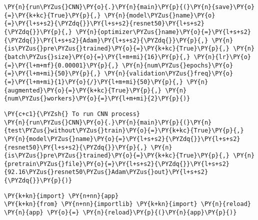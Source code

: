     \begin{tcolorbox}[breakable, size=fbox, boxrule=1pt, pad at break*=1mm,colback=cellbackground, colframe=cellborder]
\begin{Verbatim}[commandchars=\\\{\}]
\PY{n}{run\PYZus{}CNN}\PY{o}{.}\PY{n}{main}\PY{p}{(}\PY{n}{save}\PY{o}{=}\PY{k+kc}{True}\PY{p}{,} \PY{n}{model\PYZus{}name}\PY{o}{=}\PY{l+s+s2}{\PYZdq{}}\PY{l+s+s2}{resnet50}\PY{l+s+s2}{\PYZdq{}}\PY{p}{,} \PY{n}{optimizer\PYZus{}name}\PY{o}{=}\PY{l+s+s2}{\PYZdq{}}\PY{l+s+s2}{Adam}\PY{l+s+s2}{\PYZdq{}}\PY{p}{,} \PY{n}{is\PYZus{}pre\PYZus{}trained}\PY{o}{=}\PY{k+kc}{True}\PY{p}{,} \PY{n}{batch\PYZus{}size}\PY{o}{=}\PY{l+m+mi}{16}\PY{p}{,} \PY{n}{lr}\PY{o}{=}\PY{l+m+mf}{0.00001}\PY{p}{,} \PY{n}{num\PYZus{}epochs}\PY{o}{=}\PY{l+m+mi}{50}\PY{p}{,} \PY{n}{validation\PYZus{}freq}\PY{o}{=}\PY{l+m+mi}{1}\PY{o}{/}\PY{l+m+mi}{50}\PY{p}{,} \PY{n}{augmented}\PY{o}{=}\PY{k+kc}{True}\PY{p}{,} \PY{n}{num\PYZus{}workers}\PY{o}{=}\PY{l+m+mi}{2}\PY{p}{)}
\end{Verbatim}
\end{tcolorbox}

    \begin{tcolorbox}[breakable, size=fbox, boxrule=1pt, pad at break*=1mm,colback=cellbackground, colframe=cellborder]
\begin{Verbatim}[commandchars=\\\{\}]
\PY{c+c1}{\PYZsh{} To run CNN process}
\PY{n}{run\PYZus{}CNN}\PY{o}{.}\PY{n}{main}\PY{p}{(}\PY{n}{test\PYZus{}without\PYZus{}train}\PY{o}{=}\PY{k+kc}{True}\PY{p}{,} \PY{n}{model\PYZus{}name}\PY{o}{=}\PY{l+s+s2}{\PYZdq{}}\PY{l+s+s2}{resnet50}\PY{l+s+s2}{\PYZdq{}}\PY{p}{,} \PY{n}{is\PYZus{}pre\PYZus{}trained}\PY{o}{=}\PY{k+kc}{True}\PY{p}{,} \PY{n}{pretrain\PYZus{}file}\PY{o}{=}\PY{l+s+s2}{\PYZdq{}}\PY{l+s+s2}{92.16\PYZus{}resnet50\PYZus{}Adam\PYZus{}out}\PY{l+s+s2}{\PYZdq{}}\PY{p}{)}
\end{Verbatim}
\end{tcolorbox}

    \begin{tcolorbox}[breakable, size=fbox, boxrule=1pt, pad at break*=1mm,colback=cellbackground, colframe=cellborder]
\begin{Verbatim}[commandchars=\\\{\}]
\PY{k+kn}{import} \PY{n+nn}{app}
\PY{k+kn}{from} \PY{n+nn}{importlib} \PY{k+kn}{import} \PY{n}{reload}
\PY{n}{app} \PY{o}{=} \PY{n}{reload}\PY{p}{(}\PY{n}{app}\PY{p}{)}
\end{Verbatim}
\end{tcolorbox}

